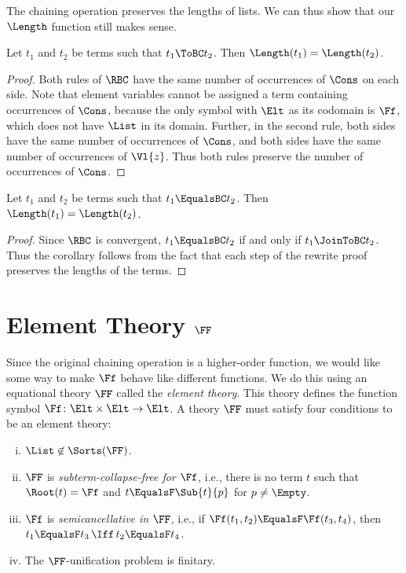 The chaining operation preserves the lengths of lists. We can thus show that
our $\Length$ function still makes sense.

\begin{Lemma}\label{lemma:rbc-preserve-cons}
    Let $t_1$ and $t_2$ be terms such that $t_1 \ToBC t_2$. Then $\Length(t_1)
    = \Length(t_2)$.
\end{Lemma}
\begin{proof}
    Both rules of $\RBC$ have the same number of occurrences of $\Cons$ on each
    side. Note that element variables cannot be assigned a term containing
    occurrences of $\Cons$, because the only symbol with $\Elt$ as its codomain
    is $\Ff$, which does not have $\List$ in its domain. Further, in the second
    rule, both sides have the same number of occurrences of $\Cons$, and both
    sides have the same number of occurrences of $\Vl{z}$. Thus both rules
    preserve the number of occurrences of $\Cons$.
\end{proof}

\begin{Corollary}\label{cor:bc-preserve-cons}
    Let $t_1$ and $t_2$ be terms such that $t_1 \EqualsBC t_2$. Then
    $\Length(t_1) = \Length(t_2)$.
\end{Corollary}
\begin{proof}
    Since $\RBC$ is convergent, $t_1 \EqualsBC t_2$ if and only if $t_1
    \JoinToBC t_2$. Thus the corollary follows from the fact that each step of
    the rewrite proof preserves the lengths of the terms.
\end{proof}



\section{Element Theory \texorpdfstring{$\FF$}{F}}\label{sec:elt-theory}

Since the original chaining operation is a higher-order function, we would like
some way to make $\Ff$ behave like different functions. We do this using an
equational theory $\FF$ called the \emph{element theory}. This theory defines
the function symbol $\Ff\colon \Elt \times \Elt \to \Elt$. A theory $\FF$ must
satisfy four conditions to be an element theory:
\begin{enumerate}[(i)]
    \item $\List \not\in \Sorts(\FF)$.
    \item $\FF$ is \emph{subterm-collapse-free for $\Ff$}, i.e., there is no
        term $t$ such that $\Root(t) = \Ff$ and $t \EqualsF \Sub{t}{p}$ for $p
        \neq \Empty$.
    \item $\Ff$ is \emph{semicancellative in $\FF$}, i.e., if $\Ff(t_1, t_2)
        \EqualsF \Ff(t_3, t_4)$, then $t_1 \EqualsF t_3 \, \Iff \, t_2 \EqualsF
        t_4$.
    \item The $\FF$-unification problem is finitary.
\end{enumerate}

